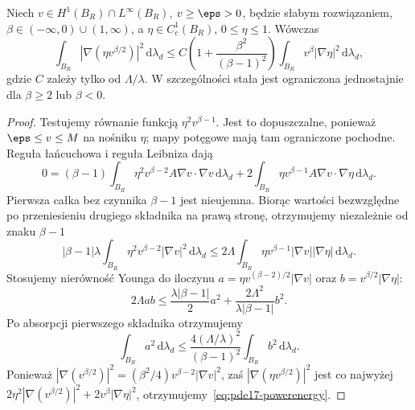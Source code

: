 \begin{lemat}
\label{lem:pde17-powers}
Niech $v\in H^1(B_R)\cap L^\infty(B_R)$, $v\ge\eps>0$,
będzie słabym rozwiązaniem, $\beta\in(-\infty,0)\cup(1,\infty)$,
a $\eta\in C_c^1(B_R)$, $0\le\eta\le1$.
Wówczas
\begin{equation}\label{eq:pde17-powerenergy}
 \int_{B_R}|\nabla(\eta v^{\beta/2})|^2\,\mathrm d\lambda_d
 \le C\left(1+\frac{\beta^2}{(\beta-1)^2}\right)
 \int_{B_R}v^\beta|\nabla\eta|^2\,\mathrm d\lambda_d,
\end{equation}
gdzie $C$ zależy tylko od $\Lambda/\lambda$.
W szczególności stała jest ograniczona jednostajnie dla
$\beta\ge2$ lub $\beta<0$.
\end{lemat}
\begin{proof}
Testujemy równanie funkcją $\eta^2v^{\beta-1}$.
Jest to dopuszczalne, ponieważ $\eps\le v\le M$ na nośniku
$\eta$; mapy potęgowe mają tam ograniczone pochodne.
Reguła łańcuchowa i reguła Leibniza dają
\[
 0=(\beta-1)\int_{B_R}\eta^2v^{\beta-2}
 A\nabla v\cdot\nabla v\,\mathrm d\lambda_d
 +2\int_{B_R}\eta v^{\beta-1}
 A\nabla v\cdot\nabla\eta\,\mathrm d\lambda_d.
\]
Pierwsza całka bez czynnika $\beta-1$ jest nieujemna.
Biorąc wartości bezwzględne po przeniesieniu drugiego
składnika na prawą stronę, otrzymujemy niezależnie od znaku
$\beta-1$
\[
 |\beta-1|\lambda\int_{B_R}\eta^2v^{\beta-2}|\nabla v|^2
 \,\mathrm d\lambda_d
 \le2\Lambda\int_{B_R}\eta v^{\beta-1}|\nabla v||\nabla\eta|
 \,\mathrm d\lambda_d.
\]
Stosujemy nierówność Younga do iloczynu
$a=\eta v^{(\beta-2)/2}|\nabla v|$ oraz
$b=v^{\beta/2}|\nabla\eta|$:
\[
 2\Lambda ab\le\frac{\lambda|\beta-1|}{2}a^2+
 \frac{2\Lambda^2}{\lambda|\beta-1|}b^2.
\]
Po absorpcji pierwszego składnika otrzymujemy
\[
 \int_{B_R}a^2\,\mathrm d\lambda_d
 \le\frac{4(\Lambda/\lambda)^2}{(\beta-1)^2}
 \int_{B_R}b^2\,\mathrm d\lambda_d.
\]
Ponieważ $|\nabla(v^{\beta/2})|^2
=(\beta^2/4)v^{\beta-2}|\nabla v|^2$,
zaś $|\nabla(\eta v^{\beta/2})|^2$ jest co najwyżej
$2\eta^2|\nabla(v^{\beta/2})|^2+2v^\beta|\nabla\eta|^2$,
otrzymujemy~\eqref{eq:pde17-powerenergy}.
\end{proof}

